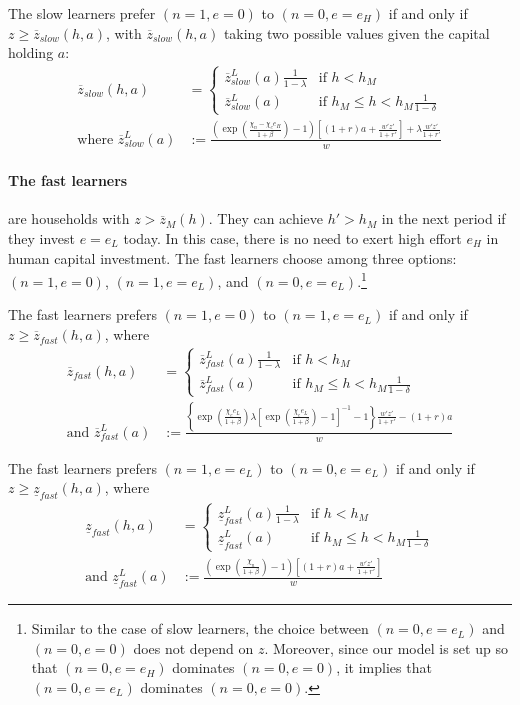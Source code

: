 \documentclass[12pt]{article}
\begin{document}
The slow learners prefer $(n=1,e=0)$ to $(n=0,e=e_H)$ if and only if $z \geq \overline{z}_{slow}(h,a)$, with $\overline{z}_{slow}(h,a)$ taking two possible values given the capital holding $a$:
\begin{align} 
\overline{z}_{slow}(h,a)&=\left \{ 
\begin{array}{cl}
\overline{z}^L_{slow}(a)\frac{1}{1-\lambda}  & \text{if }h<h_{M} \\ 
\overline{z}^L_{slow}(a) & \text{if }h_{M} \leq h<h_M\frac{1}{1-\delta}
\end{array}%
\right. \\
\text{where }\overline{z}^L_{slow}(a)&:=\frac{(\exp(\frac{\chi_n-\chi_e e_H}{1+\beta})-1)[(1+r)a+\frac{w'z'}{1+r'}]+\lambda\frac{w'z'}{1+r'}}{w} \label{eq:z-slow}
\end{align}

\paragraph{The fast learners} are households with $z > \overline{z}_M(h)$. They can achieve $h' > h_M$ in the next period if they invest $e = e_L$ today. In this case, there is no need to exert high effort $e_H$ in human capital investment. The fast learners choose among three options: $(n=1,e=0)$, $(n=1,e=e_L)$, and $(n=0,e=e_L)$.\footnote{Similar to the case of slow learners, the choice between $(n=0,e=e_L)$ and $(n=0,e=0)$ does not depend on $z$. Moreover, since our model is set up so that $(n=0,e=e_H)$ dominates $(n=0,e=0)$, it implies that $(n=0,e=e_L)$ dominates $(n=0,e=0)$. }

The fast learners prefers $(n=1,e=0)$ to $(n=1,e=e_L)$ if and only if $z\geq \overline{z}_{fast}(h,a)$, where
\begin{align}
\overline{z}_{fast}(h,a)&=\left \{ 
\begin{array}{cl}
\overline{z}^L_{fast}(a)\frac{1}{1-\lambda}  & \text{if }h<h_{M} \\ 
\overline{z}^L_{fast}(a) & \text{if }h_{M} \leq h<h_M\frac{1}{1-\delta}
\end{array}%
\right. \\
\text{and }\overline{z}^L_{fast}(a)&:=\frac{\left\{\exp(\frac{\chi_e e_L}{1+\beta})\lambda\left[\exp(\frac{\chi_e e_L}{1+\beta})-1\right]^{-1}-1\right\}\frac{w'z'}{1+r'}-(1+r)a}{w}  \label{eq:z-fast-upper}
\end{align}

The fast learners prefers $(n=1,e=e_L)$ to $(n=0,e=e_L)$ if and only if $z\geq \underline{z}_{fast}(h,a)$, where
\begin{align}
\underline{z}_{fast}(h,a)&=\left \{ 
\begin{array}{cl}
\underline{z}^L_{fast}(a)\frac{1}{1-\lambda}  & \text{if }h<h_{M} \\ 
\underline{z}^L_{fast}(a) & \text{if }h_{M} \leq h<h_M\frac{1}{1-\delta}
\end{array}%
\right. \\
\text{and }\underline{z}^L_{fast}(a)&:=\frac{(\exp(\frac{\chi_n}{1+\beta})-1)[(1+r)a+\frac{w'z'}{1+r'}]}{w} \label{eq:z-fast-lower}
\end{align}
\end{document}
